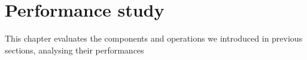 \chapter{Performance study}
    This chapter evaluates the components and operations we introduced in previous sections, analysing their performances

 
     
